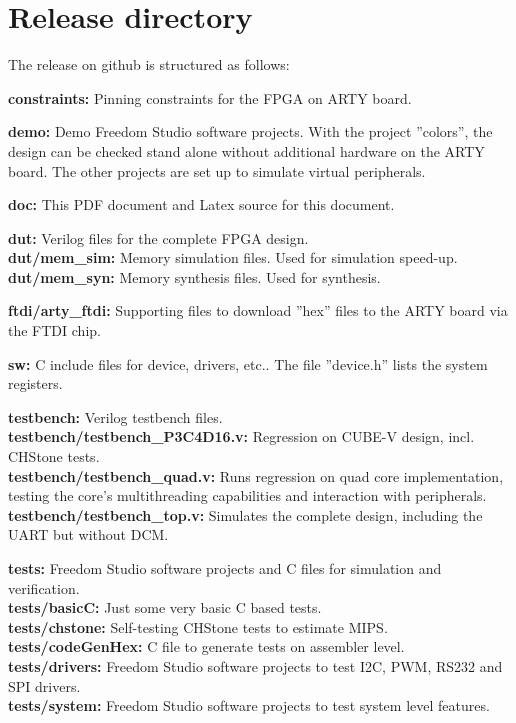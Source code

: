 \chapter{Release directory}

The release on github is structured as follows:

\textbf{constraints:}	Pinning constraints for the FPGA on ARTY board.

\textbf{demo:}		Demo Freedom Studio software projects. With the project ''colors'', the design can be checked stand alone without additional hardware on the ARTY board. The other projects are set up to simulate virtual peripherals.

\textbf{doc:}		This PDF document and Latex source for this document.

\textbf{dut:}		Verilog files for the complete FPGA design.\\ 
\textbf{dut/mem\_sim:}	Memory simulation files. Used for simulation speed-up.\\
\textbf{dut/mem\_syn:}	Memory synthesis files. Used for synthesis.

\textbf{ftdi/arty\_ftdi:} Supporting files to download ''hex'' files to the ARTY board via the FTDI chip.

\textbf{sw:}		C include files for device, drivers, etc.. The file ''device.h'' lists the system registers.

\textbf{testbench:}	Verilog testbench files.\\
\textbf{testbench/testbench\_P3C4D16.v:} Regression on CUBE-V design, incl. CHStone tests.\\
\textbf{testbench/testbench\_quad.v:} Runs regression on quad core implementation, testing the core's multithreading capabilities and interaction with peripherals.\\
\textbf{testbench/testbench\_top.v:} Simulates the complete design, including the UART but without DCM.

\textbf{tests:}		Freedom Studio software projects and C files for simulation and verification.\\
\textbf{tests/basicC:} Just some very basic C based tests.\\
\textbf{tests/chstone:} Self-testing CHStone tests to estimate MIPS.\\
\textbf{tests/codeGenHex:} C file to generate tests on assembler level.\\
\textbf{tests/drivers:} Freedom Studio software projects to test I2C, PWM, RS232 and SPI drivers.\\
\textbf{tests/system:} Freedom Studio software projects to test system level features.

